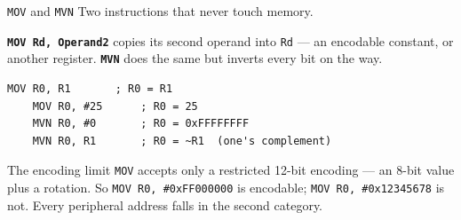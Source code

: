 \documentclass[9pt,aspectratio=169,xcolor=table]{beamer}
\begin{document}
\begin{frame}[fragile]{\texttt{MOV} and \texttt{MVN}}
    \leavevmode
    {\small Two instructions that never touch memory.}

    \vspace{2mm}
    {\small \textbf{\texttt{MOV Rd, Operand2}} copies its second operand
    into \texttt{Rd} --- an encodable constant, or another register.
    \textbf{\texttt{MVN}} does the same but inverts every bit on the way.}

    \vspace{2mm}
    \begin{center}
    \begin{lstlisting}[style=armasm, language=ARM, basicstyle=\normalsize\ttfamily]
	MOV R0, R1       ; R0 = R1
	MOV R0, #25      ; R0 = 25
	MVN R0, #0       ; R0 = 0xFFFFFFFF
	MVN R0, R1       ; R0 = ~R1  (one's complement)
    \end{lstlisting}
    \end{center}

    \vspace{2mm}
    \begin{block}{The encoding limit}
        \texttt{MOV} accepts only a restricted 12-bit encoding --- an 8-bit
        value plus a rotation. So \texttt{MOV R0, \#0xFF000000} is
        encodable; \texttt{MOV R0, \#0x12345678} is \alert{not}. Every
        peripheral address falls in the second category.
    \end{block}
\end{frame}
\end{document}
